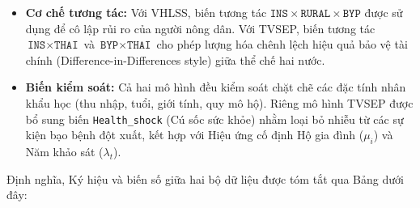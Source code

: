 \documentclass[12pt,a4paper]{article}
\begin{document}
\begin{itemize}
	\item \textbf{Cơ chế tương tác:} 
	Với VHLSS, biến tương tác $\texttt{INS} \times \texttt{RURAL} \times \texttt{BYP}$ được sử dụng để cô lập rủi ro của người nông dân. Với TVSEP, biến tương tác $\texttt{INS} \times \texttt{THAI}$ và $\texttt{BYP} \times \texttt{THAI}$ cho phép lượng hóa chênh lệch hiệu quả bảo vệ tài chính (Difference-in-Differences style) giữa thể chế hai nước.
	
	\item \textbf{Biến kiểm soát:} 
	Cả hai mô hình đều kiểm soát chặt chẽ các đặc tính nhân khẩu học (thu nhập, tuổi, giới tính, quy mô hộ). Riêng mô hình TVSEP được bổ sung biến \texttt{Health\_shock} (Cú sốc sức khỏe) nhằm loại bỏ nhiễu từ các sự kiện bạo bệnh đột xuất, kết hợp với Hiệu ứng cố định Hộ gia đình ($\mu_i$) và Năm khảo sát ($\lambda_t$).
\end{itemize}

Định nghĩa, Ký hiệu và biến số giữa hai bộ dữ liệu được tóm tắt qua Bảng \label{tab:combined_variables} dưới đây: 
\end{document}
